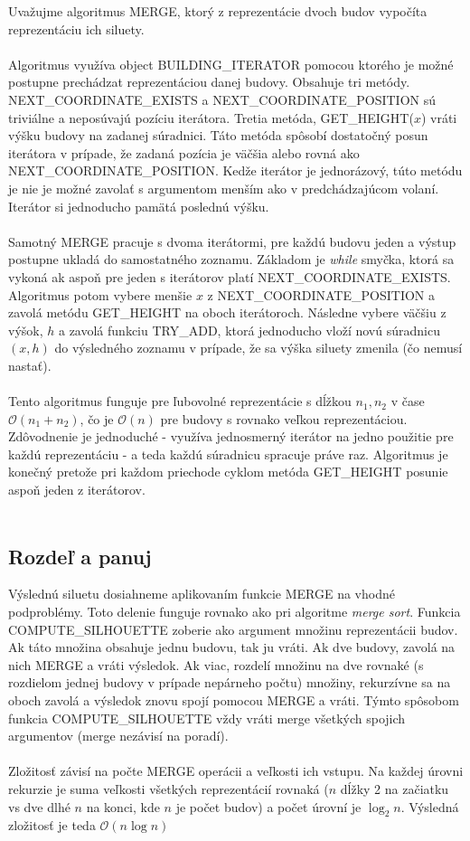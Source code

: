 \documentclass[paper=a4, fontsize=11pt]{scrartcl} %
\numberwithin{equation}{section} %
\numberwithin{figure}{section} %
\numberwithin{table}{section} %
\begin{document}
Uvažujme algoritmus MERGE, ktorý z reprezentácie dvoch budov vypočíta reprezentáciu ich siluety. \\
\\
Algoritmus využíva object BUILDING\_ITERATOR pomocou ktorého je možné postupne prechádzat reprezentáciou danej budovy. Obsahuje tri  metódy. \\
NEXT\_COORDINATE\_EXISTS a NEXT\_COORDINATE\_POSITION sú triviálne a neposúvajú pozíciu iterátora. Tretia metóda, GET\_HEIGHT($x$) vráti výšku budovy na zadanej súradnici. Táto metóda spôsobí dostatočný posun iterátora v prípade, že zadaná pozícia je väčšia alebo rovná ako NEXT\_COORDINATE\_POSITION. Kedže iterátor je jednorázový, túto metódu je nie je možné zavolať s argumentom menším ako v predchádzajúcom volaní. Iterátor si jednoducho pamätá poslednú výšku. \\
\\
Samotný MERGE pracuje s dvoma iterátormi, pre každú budovu jeden a výstup postupne ukladá do samostatného zoznamu. Základom je {\em while} smyčka, ktorá sa vykoná ak aspoň pre jeden s iterátorov platí NEXT\_COORDINATE\_EXISTS.
Algoritmus potom vybere menšie $x$ z NEXT\_COORDINATE\_POSITION a zavolá metódu GET\_HEIGHT na oboch iterátoroch. Následne vybere väčšiu z výšok, $h$ a zavolá funkciu TRY\_ADD, ktorá jednoducho vloží novú súradnicu $(x, h)$ do výsledného zoznamu v prípade, že sa výška siluety zmenila (čo nemusí nastať). \\
\\
Tento algoritmus funguje pre ľubovolné reprezentácie s dĺžkou $n_1, n_2$ v čase $\mathcal{O}(n_1 + n_2)$, čo je $\mathcal{O}(n)$ pre budovy s rovnako veľkou reprezentáciou. Zdôvodnenie je jednoduché - využíva jednosmerný iterátor na jedno použitie pre  každú reprezentáciu - a teda každú súradnicu spracuje práve raz. Algoritmus je konečný pretože pri každom priechode cyklom metóda GET\_HEIGHT posunie aspoň jeden z iterátorov. \\
\\

\subsection*{Rozdeľ a panuj}

Výslednú siluetu dosiahneme aplikovaním funkcie MERGE na vhodné podproblémy. Toto delenie funguje rovnako ako pri algoritme {\em merge sort}. Funkcia COMPUTE\_SILHOUETTE zoberie ako argument množinu reprezentácii budov. Ak táto množina obsahuje jednu budovu, tak ju vráti. Ak dve budovy, zavolá na nich MERGE a vráti výsledok. Ak viac, rozdelí množinu na dve rovnaké (s rozdielom jednej budovy v prípade nepárneho počtu) množiny, rekurzívne sa na oboch zavolá a výsledok znovu spojí pomocou MERGE a vráti. Týmto spôsobom funkcia COMPUTE\_SILHOUETTE vždy vráti merge všetkých spojich argumentov (merge nezávisí na poradí). \\
\\
Zložitosť závisí na počte MERGE operácii a veľkosti ich vstupu. Na každej úrovni rekurzie je suma veľkosti všetkých reprezentácií rovnaká ($n$ dĺžky 2 na začiatku vs dve dlhé $n$ na konci, kde $n$ je počet budov) a počet úrovní je $\log_2 n$. Výsledná zložitosť je teda $\mathcal{O}(n \log n)$
\end{document}
